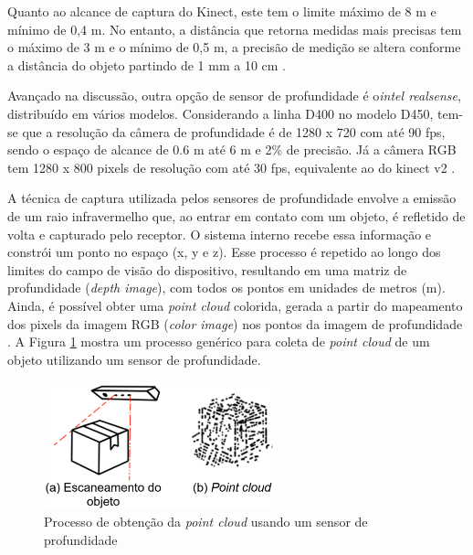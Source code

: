     Quanto ao alcance de captura do Kinect, este tem o limite máximo de 8 m e mínimo de 0,4 m. No entanto, a distância que retorna medidas mais precisas tem o máximo de 3 m e o mínimo de 0,5 m, a precisão de medição se altera conforme a distância do objeto partindo de 1 mm a 10 cm \cite{guffanti_2020_the}. 
        
    Avançado na discussão, outra opção de sensor de profundidade é o\textit{intel realsense}, distribuído em vários modelos. Considerando a linha D400 no modelo D450, tem-se que a resolução da câmera de profundidade é de 1280 x 720 com até 90 fps, sendo o espaço de alcance de 0.6 m até 6 m e 2\% de precisão. Já a câmera RGB tem 1280 x 800 pixels de resolução com até 30 fps, equivalente ao do kinect v2 \cite{intel_2021_introducing}.

    A técnica de captura utilizada pelos sensores de profundidade envolve a emissão de um raio infravermelho que, ao entrar em contato com um objeto, é refletido de volta e capturado pelo receptor. O sistema interno recebe essa informação e constrói um ponto no espaço (x, y e z). Esse processo é repetido ao longo dos limites do campo de visão do dispositivo, resultando em uma matriz de profundidade (\textit{depth image}), com todos os pontos em unidades de metros (m). Ainda, é possível obter uma \textit{point cloud} colorida, gerada a partir do mapeamento dos pixels da imagem RGB (\textit{color image}) nos pontos da imagem de profundidade \cite{mathworks_2017_acquire, jiao_2017_a}. A Figura \ref{fig:ColetandopointCloudComSensorDeProfundidade} mostra um processo genérico para coleta de \textit{point cloud} de um objeto utilizando um sensor de profundidade.
    
        \begin{figure}[h]
           \centering
           \includegraphics[width=0.6\textwidth]{imagens/processoDeObtencaoPointCloudSensorProfundidade.png} 
           \caption{Processo de obtenção da \textit{point cloud} usando um sensor de profundidade}
           \label{fig:ColetandopointCloudComSensorDeProfundidade}
        \end{figure}



